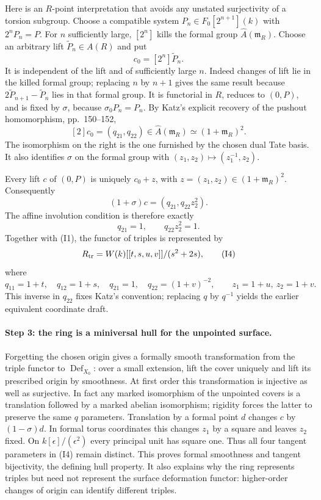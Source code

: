 Here is an $R$-point interpretation that avoids any unstated surjectivity
of a torsion subgroup. Choose a compatible system
$P_n\in F_0[2^{n+1}](k)$ with $2^nP_n=P$. For $n$ sufficiently large,
$[2^n]$ kills the formal group $\widehat A(\mathfrak m_R)$.
Choose an arbitrary lift $\widetilde P_n\in A(R)$ and put
\[
 c_0=[2^n]\widetilde P_n.
\]
It is independent of the lift and of sufficiently large $n$.
Indeed changes of lift lie in the killed formal group; replacing
$n$ by $n+1$ gives the same result because
$2\widetilde P_{n+1}-\widetilde P_n$ lies in that formal group.
It is functorial in $R$, reduces to $(0,P)$, and is fixed by $\sigma$,
because $\sigma_0P_n=P_n$. By Katz's explicit recovery of the
pushout homomorphism, pp.~150--152,
\[
 [2]c_0=(q_{21},q_{22})\in
 \widehat A(\mathfrak m_R)\simeq(1+\mathfrak m_R)^2.        \tag{I2}
\]
The isomorphism on the right is the one furnished by the chosen dual
Tate basis. It also identifies $\sigma$ on the formal group with
$(z_1,z_2)\mapsto(z_1^{-1},z_2)$.

Every lift $c$ of $(0,P)$ is uniquely $c_0+z$, with
$z=(z_1,z_2)\in(1+\mathfrak m_R)^2$. Consequently
\[
 (1+\sigma)c=(q_{21},q_{22}z_2^2).
\]
The affine involution condition is therefore exactly
\[
 q_{21}=1,\qquad q_{22}z_2^2=1.                           \tag{I3}
\]
Together with (I1), the functor of triples is represented by
\[
 R_{\rm tr}=W(k)[[t,s,u,v]]/(s^2+2s),                     \tag{I4}
\]
where
\[
 q_{11}=1+t,\quad q_{12}=1+s,\quad q_{21}=1,\quad
 q_{22}=(1+v)^{-2},\qquad z_1=1+u,\ z_2=1+v.
\]
This inverse in $q_{22}$ fixes Katz's convention; replacing $q$ by
$q^{-1}$ yields the earlier equivalent coordinate draft.

\paragraph{Step 3: the ring is a miniversal hull for the unpointed surface.}
Forgetting the chosen origin gives a formally smooth transformation
from the triple functor to $\operatorname{Def}_{X_0}$: over a small
extension, lift the cover uniquely and lift its prescribed origin by
smoothness. At first order this transformation is injective as well
as surjective. In fact any marked isomorphism of the unpointed covers
is a translation followed by a marked abelian isomorphism; rigidity
forces the latter to preserve the same $q$ parameters. Translation
by a formal point $d$ changes $c$ by $(1-\sigma)d$. In formal torus
coordinates this changes $z_1$ by a square and leaves $z_2$ fixed.
On $k[\epsilon]/(\epsilon^2)$ every principal unit has square one.
Thus all four tangent parameters in (I4) remain distinct. This proves
formal smoothness and tangent bijectivity, the defining hull property.
It also explains why the ring represents triples but need not represent
the surface deformation functor: higher-order changes of origin can
identify different triples.

